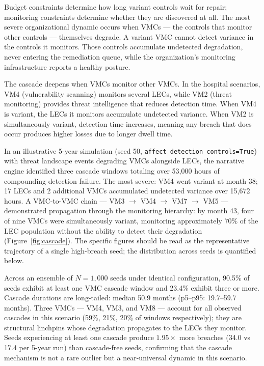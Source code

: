 \documentclass[11pt,a4paper]{article}
\begin{document}
Budget constraints determine how long variant controls wait for repair; monitoring constraints determine whether they are discovered at all. The most severe organizational dynamic occurs when VMCs --- the controls that monitor other controls --- themselves degrade. A variant VMC cannot detect variance in the controls it monitors. Those controls accumulate undetected degradation, never entering the remediation queue, while the organization's monitoring infrastructure reports a healthy posture.

The cascade deepens when VMCs monitor other VMCs. In the hospital scenarios, VM4 (vulnerability scanning) monitors several LECs, while VM2 (threat monitoring) provides threat intelligence that reduces detection time. When VM4 is variant, the LECs it monitors accumulate undetected variance. When VM2 is simultaneously variant, detection time increases, meaning any breach that does occur produces higher losses due to longer dwell time.

In an illustrative 5-year simulation (seed 50, \texttt{affect\_\allowbreak detection\_\allowbreak controls\allowbreak =True}) with threat landscape events degrading VMCs alongside LECs, the narrative engine identified three cascade windows totaling over 53,000 hours of compounding detection failure. The most severe: VM4 went variant at month 38; 17 LECs and 2 additional VMCs accumulated undetected variance over 15,672 hours. A VMC-to-VMC chain --- VM3 $\to$ VM4 $\to$ VM7 $\to$ VM5 --- demonstrated propagation through the monitoring hierarchy: by month 43, four of nine VMCs were simultaneously variant, monitoring approximately 70\% of the LEC population without the ability to detect their degradation (Figure~\ref{fig:cascade}). The specific figures should be read as the representative trajectory of a single high-breach seed; the distribution across seeds is quantified below.

Across an ensemble of $N=1{,}000$ seeds under identical configuration, 90.5\% of seeds exhibit at least one VMC cascade window and 23.4\% exhibit three or more. Cascade durations are long-tailed: median 50.9 months (p5--p95: 19.7--59.7 months). Three VMCs --- VM4, VM3, and VM8 --- account for all observed cascades in this scenario (59\%, 21\%, 20\% of windows respectively); they are structural linchpins whose degradation propagates to the LECs they monitor. Seeds experiencing at least one cascade produce $1.95\times$ more breaches (34.0 vs 17.4 per 5-year run) than cascade-free seeds, confirming that the cascade mechanism is not a rare outlier but a near-universal dynamic in this scenario.
\end{document}
